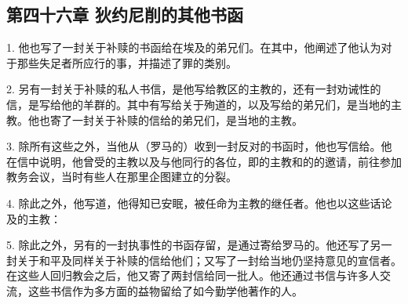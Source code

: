 
\subsection{第四十六章 狄约尼削的其他书函}

1. 他也写了一封关于补赎的书函给在埃及的弟兄们。在其中，他阐述了他认为对于那些失足者所应行的事，并描述了罪的类别。\par

2. 另有一封关于补赎的私人书信，是他写给教区的主教的，还有一封劝诫性的信，是写给他的羊群的。其中有写给关于殉道的，以及写给的弟兄们，是当地的主教。他也寄了一封关于补赎的信给的弟兄们，是当地的主教。\par

3. 除所有这些之外，当他从（罗马的）收到一封反对的书函时，他也写信给。他在信中说明，他曾受的主教以及与他同行的各位，即的主教和的的邀请，前往参加教务会议，当时有些人在那里企图建立的分裂。\par

4. 除此之外，他写道，他得知已安眠，被任命为主教的继任者。他也以这些话论及的主教：\par

5. 除此之外，另有的一封执事性的书函存留，是通过寄给罗马的。他还写了另一封关于和平及同样关于补赎的信给他们；又写了一封给当地仍坚持意见的宣信者。在这些人回归教会之后，他又寄了两封信给同一批人。他还通过书信与许多人交流，这些书信作为多方面的益物留给了如今勤学他著作的人。\par



\section{}


